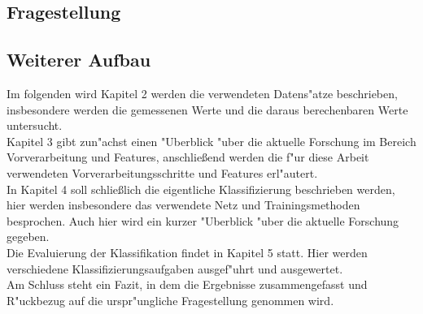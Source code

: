 \subsection{Fragestellung}
\label{Fragestellung}


\subsection{Weiterer Aufbau}
\label{Weiterer Aufbau}
	Im folgenden wird Kapitel 2 werden die verwendeten Datens"atze beschrieben, insbesondere werden die gemessenen Werte und die daraus berechenbaren Werte untersucht.\\
	Kapitel 3 gibt zun"achst einen "Uberblick "uber die aktuelle Forschung im Bereich Vorverarbeitung und Features, anschlie{\ss}end werden die f"ur diese Arbeit verwendeten Vorverarbeitungsschritte und Features erl"autert. \\
	In Kapitel 4 soll schlie{\ss}lich die eigentliche Klassifizierung beschrieben werden, hier werden insbesondere das verwendete Netz und Trainingsmethoden besprochen. Auch hier wird ein kurzer "Uberblick "uber die aktuelle Forschung gegeben.\\
	Die Evaluierung der Klassifikation findet in Kapitel 5 statt. Hier werden verschiedene Klassifizierungsaufgaben ausgef"uhrt und ausgewertet.\\
	Am Schluss steht ein Fazit, in dem die Ergebnisse zusammengefasst und R"uckbezug auf die urspr"ungliche Fragestellung genommen wird.\\